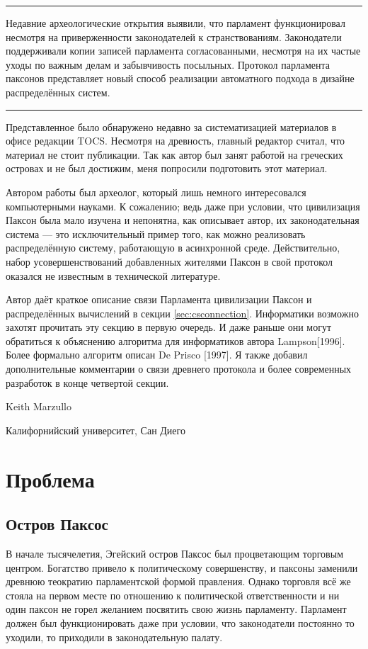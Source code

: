 \documentclass[12pt, a4paper]{article} %
\begin{document}
\noindent\rule{\textwidth}{0.4pt}
Недавние археологические открытия выявили, что парламент функционировал несмотря на приверженности законодателей к странствованиям. Законодатели поддерживали копии записей парламента согласованными, несмотря на их частые уходы по важным делам и забывчивость посыльных. Протокол парламента паксонов представляет новый способ реализации автоматного подхода в дизайне распределённых систем.\\
\noindent\rule{\textwidth}{0.4pt}


Представленное было обнаружено недавно за систематизацией материалов в офисе редакции TOCS. Несмотря на древность, главный редактор считал, что материал не стоит публикации. Так как автор был занят работой на греческих островах и не был достижим, меня попросили подготовить этот материал.

Автором работы был археолог, который лишь немного интересовался компьютерными науками. К сожалению; ведь даже при условии, что цивилизация Паксон была мало изучена и непонятна, как описывает автор, их законодательная система --- это исключительный пример того, как можно реализовать распределённую систему, работающую в асинхронной среде. Действительно, набор усовершенствований добавленных жителями Паксон в свой протокол оказался не известным в технической литературе.

Автор даёт краткое описание связи Парламента цивилизации Паксон и распределённых вычислений в секции \ref{sec:csconnection}. Информатики возможно захотят прочитать эту секцию в первую очередь. И даже раньше они могут обратиться к объяснению алгоритма для информатиков автора Lampson[1996]. Более формально алгоритм описан De Prisco [1997]. Я также добавил дополнительные комментарии о связи древнего протокола и более современных разработок в конце четвертой секции.


\begin{flushright}
Keith Marzullo

Калифорнийский университет, Сан Диего
\end{flushright}

\newpage
\section{Проблема}
\subsection{Остров Паксос}

В начале тысячелетия, Эгейский остров Паксос был процветающим торговым центром. Богатство привело к политическому совершенству, и паксоны заменили древнюю теократию парламентской формой правления. Однако торговля всё же стояла на первом месте по отношению к политической ответственности и ни один паксон не горел желанием посвятить свою жизнь парламенту. Парламент должен был функционировать даже при условии, что законодатели постоянно то уходили, то приходили в законодательную палату.
\end{document}
